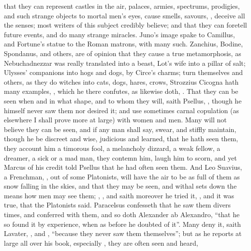 that they can represent castles in the air, palaces, armies, spectrums,
prodigies, and such strange objects to mortal men's eyes,
cause smells, savours, \etc{}, deceive all the senses;
most writers of this subject credibly believe; and that they can foretell
future events, and do many strange miracles. Juno's image spake to Camillus,
and Fortune's statue to the Roman matrons, with many such. Zanchius, Bodine,
Spondanus, and others, are of opinion that they cause a true metamorphosis, as
Nebuchadnezzar was really translated into a beast, Lot's wife into a pillar of
salt; Ulysses' companions into hogs and dogs, by Circe's charms; turn
themselves and others, as they do witches into cats, dogs, hares, crows, \etc{}
Strozzius Cicogna hath many examples, , which he there confutes, as \Austin{} likewise doth,
. That they can be seen when and
in what shape, and to whom they will, saith Psellus, , though he himself never saw them nor desired it;
and use sometimes carnal copulation (as elsewhere I shall
prove more at large) with women and men. Many will not
believe they can be seen, and if any man shall say, swear, and stiffly
maintain, though he be discreet and wise, judicious and learned, that he hath
seen them, they account him a timorous fool, a melancholy dizzard, a weak
fellow, a dreamer, a sick or a mad man, they contemn him, laugh him to scorn,
and yet Marcus of his credit told Psellus that he had often seen them. And Leo
Suavius, a Frenchman, , out of some Platonists, will have the air to be as full of
them as snow falling in the skies, and that they may be seen, and withal sets
down the means how men may see them; ,
\etc{}, and saith moreover he tried it, ,
and it was true, that the Platonists said. Paracelsus confesseth that he saw
them divers times, and conferred with them, and so doth Alexander ab
Alexandro, \enquote{that he so found it by experience, when as
before he doubted of it}. Many deny it, saith Lavater, , and , \enquote{because
they never saw them themselves}; but as he reports at large all over his book,
especially , they are often seen and heard,
